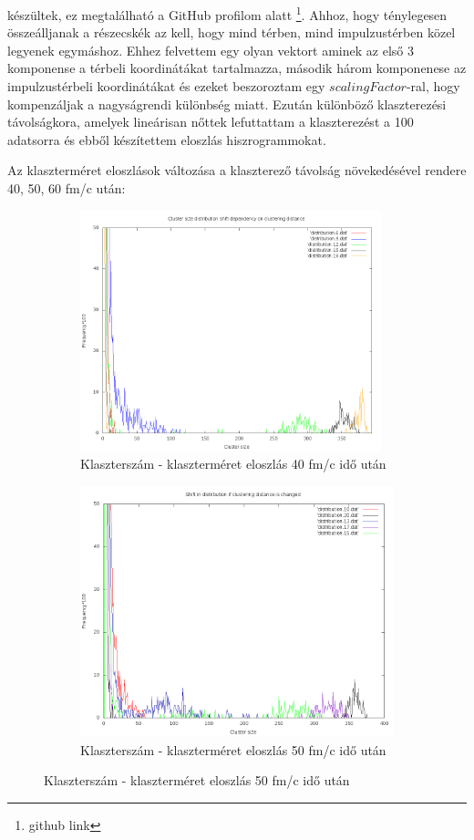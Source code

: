 \documentclass[a4paper,12pt]{article}
\begin{document}
készültek, ez megtalálható a GitHub profilom alatt \footnote{github link}. Ahhoz, hogy ténylegesen összeálljanak a részecskék az kell, hogy mind térben,
mind impulzustérben közel legyenek egymáshoz. Ehhez felvettem egy olyan vektort aminek az első 3 komponense a térbeli koordinátákat tartalmazza,
második három komponenese az impulzustérbeli koordinátákat és ezeket beszoroztam egy $scalingFactor$-ral, hogy kompenzáljak a nagyságrendi különbség
miatt. Ezután különböző klaszterezési távolságkora, amelyek lineárisan nőttek lefuttattam a klaszterezést a 100 adatsorra és ebből készítettem eloszlás
hiszrogrammokat.
\par Az klaszterméret eloszlások változása a klaszterező távolság növekedésével rendere 40, 50, 60 fm/c után:
\begin{figure}[H]
	\centering
	\begin{subfigure}{.45\textwidth}
		\includegraphics[width=0.96\textwidth]{ShiftInDistro80.png}
		\caption{ Klaszterszám - klaszterméret eloszlás 40 fm/c idő után }
	\end{subfigure}
	\begin{subfigure}{.45\textwidth}
		\includegraphics[width=.96\textwidth]{ShiftInDistro100.png}
		\caption{ Klaszterszám - klaszterméret eloszlás 50 fm/c idő után} 
	\end{subfigure}
\end{figure}
\end{document}
